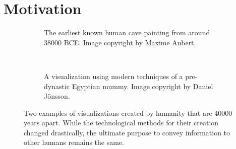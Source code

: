 \chapter{Motivation} \label{cha:motivation}
\begin{figure}[!b]
  \centering
  \begin{subfigure}{\abtwoimagewidth}
    \caption{The earliest known human cave painting from around 38000 BCE. Image copyright by Maxime Aubert.}
    \label{fig:motivation:vis:cave}
  \end{subfigure}
  ~
  \begin{subfigure}{\abtwoimagewidth}
    \caption{A visualization using modern techniques of a pre-dynastic Egyptian mummy. Image copyright by Daniel J\"onsson.}
    \label{fig:motivation:vis:modern}
  \end{subfigure}
  \caption{Two examples of visualizations created by humanity that are 40000 years apart.  While the technological methods for their creation changed drastically, the ultimate purpose to convey information to other humans remains the same.}
  \label{fig:motivation:vis}
\end{figure}

